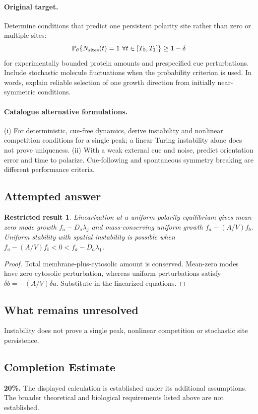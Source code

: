 \documentclass[11pt]{article}
\newcommand{\Prob}{\mathbb P}
\providecommand{\Prob}{\mathbb P}
\newtheorem{attemptresult}{Restricted result}[section]
\begin{document}
\paragraph{Original target.}
Determine conditions that predict one persistent polarity site rather than zero or multiple sites:
\[
\Prob_\theta\{N_{\rm sites}(t)=1\ \forall t\in[T_0,T_1]\}\geq1-\delta
\]
for experimentally bounded protein amounts and prespecified cue perturbations. Include stochastic molecule fluctuations when the probability criterion is used. In words, explain reliable selection of one growth direction from initially near-symmetric conditions.
\paragraph{Catalogue alternative formulations.}
(i) For deterministic, cue-free dynamics, derive instability and nonlinear competition conditions for a single peak; a linear Turing instability alone does not prove uniqueness. (ii) With a weak external cue and noise, predict orientation error and time to polarize. Cue-following and spontaneous symmetry breaking are different performance criteria.
\subsection{Attempted answer}
\begin{attemptresult}
Linearization at a uniform polarity equilibrium gives mean-zero mode growth $f_a-D_a\lambda_j$ and mass-conserving uniform growth $f_a-(A/V)f_b$. Uniform stability with spatial instability is possible when $f_a-(A/V)f_b<0<f_a-D_a\lambda_1$.
\end{attemptresult}
\begin{proof}
Total membrane-plus-cytosolic amount is conserved. Mean-zero modes have zero cytosolic perturbation, whereas uniform perturbations satisfy $\delta b=-(A/V)\delta a$. Substitute in the linearized equations.
\end{proof}
\subsection{What remains unresolved}
Instability does not prove a single peak, nonlinear competition or stochastic site persistence.
\subsection{Completion Estimate}
\textbf{20\%.} The displayed calculation is established under its additional assumptions. The broader theoretical and biological requirements listed above are not established.
\end{document}
